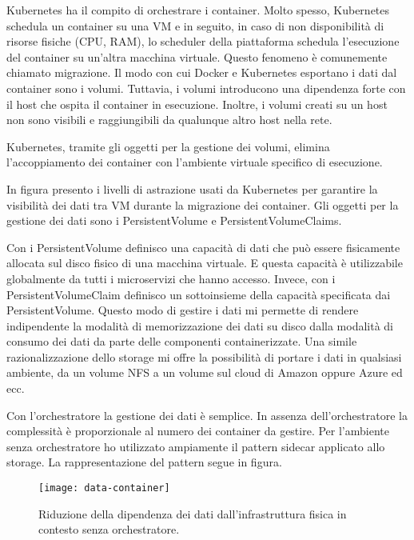Kubernetes ha il compito di orchestrare i container. Molto spesso, 
Kubernetes schedula un container su una VM e in seguito, in caso 
di non disponibilità di risorse fisiche (CPU, RAM), 
lo scheduler della piattaforma schedula l'esecuzione del 
container su un'altra macchina virtuale. Questo fenomeno 
è comunemente chiamato migrazione.  Il modo con cui Docker e Kubernetes 
esportano i dati dal container sono i volumi. Tuttavia, i volumi 
introducono una dipendenza forte con il host che ospita il container 
in esecuzione. Inoltre, i volumi creati su un host non sono
visibili e raggiungibili da qualunque altro host nella rete.

Kubernetes, tramite gli oggetti per la gestione dei volumi, elimina
l'accoppiamento dei container con l'ambiente virtuale specifico
di esecuzione.

In figura presento i livelli di astrazione usati da Kubernetes 
per garantire la visibilità dei dati tra VM durante la migrazione dei container.
Gli oggetti per la gestione dei dati sono i PersistentVolume e
PersistentVolumeClaims. 

Con i PersistentVolume definisco una capacità di dati che può essere fisicamente 
allocata sul disco fisico di una macchina virtuale. E questa capacità 
è utilizzabile globalmente da tutti i microservizi che hanno accesso. 
Invece, con i PersistentVolumeClaim definisco un sottoinsieme della 
capacità specificata dai PersistentVolume. 
Questo modo di gestire i dati mi permette di rendere indipendente la 
modalità di memorizzazione dei dati su disco dalla modalità di consumo 
dei dati da parte delle componenti containerizzate.
Una simile razionalizzazione dello storage mi offre la possibilità
di portare i dati in qualsiasi ambiente, da un volume NFS a un volume sul
cloud di Amazon oppure Azure ed ecc.

Con l'orchestratore la gestione dei dati è semplice.
In assenza dell'orchestratore la complessità  
è proporzionale al numero dei container da gestire.
Per l'ambiente senza orchestratore ho utilizzato ampiamente
il pattern sidecar applicato allo storage.
La  rappresentazione del pattern segue in figura.   

\begin{figure}[htbp]
	\begin{center}
		\texttt{[image: data-container]}
		\caption{Riduzione della dipendenza dei dati dall'infrastruttura fisica in contesto senza orchestratore.}
	\end{center}
\end{figure}

